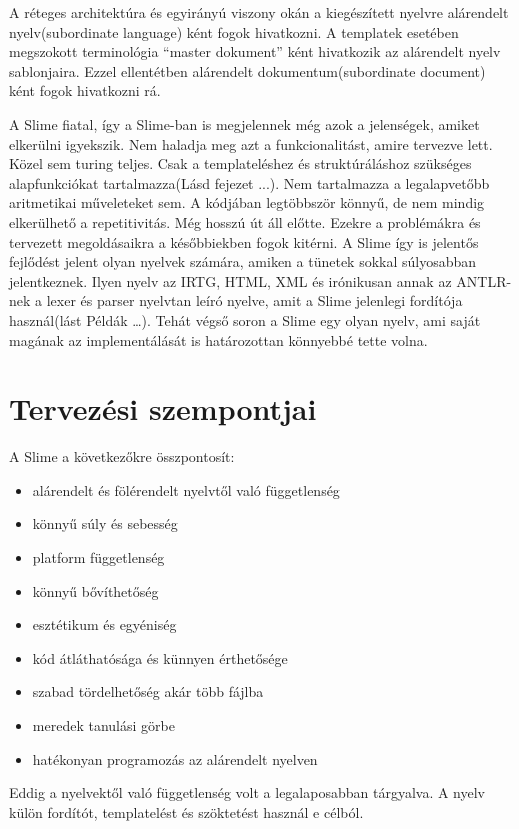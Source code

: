 A réteges architektúra és egyirányú viszony okán a kiegészített nyelvre alárendelt nyelv(subordinate language) ként fogok hivatkozni.
A templatek esetében megszokott terminológia “master dokument” ként hivatkozik az alárendelt nyelv sablonjaira.
Ezzel ellentétben alárendelt dokumentum(subordinate document) ként fogok hivatkozni rá. 

A Slime fiatal, így a Slime-ban is megjelennek még azok a jelenségek, amiket elkerülni igyekszik. 
Nem haladja meg azt a funkcionalitást, amire tervezve lett. 
Közel sem turing teljes. 
Csak a templateléshez és struktúráláshoz szükséges alapfunkciókat tartalmazza(Lásd fejezet ...). 
Nem tartalmazza a legalapvetőbb aritmetikai műveleteket sem. 
A kódjában legtöbbször könnyű, de nem mindig elkerülhető a repetitivitás. 
Még hosszú út áll előtte. 
Ezekre a problémákra és tervezett megoldásaikra a későbbiekben fogok kitérni. 
A Slime így is jelentős fejlődést jelent olyan nyelvek számára, amiken a tünetek sokkal súlyosabban jelentkeznek. 
Ilyen nyelv az IRTG, HTML, XML és irónikusan annak az ANTLR-nek a lexer és parser nyelvtan leíró nyelve, amit a Slime jelenlegi fordítója használ(lást Példák …). 
Tehát végső soron a Slime egy olyan nyelv, ami saját magának az implementálását is határozottan könnyebbé tette volna.


\section{Tervezési szempontjai}
A Slime a következőkre összpontosít:
\begin{itemize}
\item alárendelt és fölérendelt nyelvtől való függetlenség
\item könnyű súly és sebesség
\item platform függetlenség
\item könnyű bővíthetőség
\item esztétikum és egyéniség
\item kód átláthatósága és künnyen érthetősége
\item szabad tördelhetőség akár több fájlba
\item meredek tanulási görbe
\item hatékonyan programozás az alárendelt nyelven
\end{itemize}

Eddig a nyelvektől való függetlenség volt a legalaposabban tárgyalva. 
A nyelv külön fordítót, templatelést és szöktetést használ e célból.

